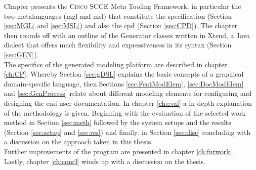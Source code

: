 Chapter  presents the \textsc{Cinco} SCCE Meta Tooling Framework, in particular the two metalanguages (\acrfull{mgl} and \acrfull{msl}) that constitute the specification (Section \ref{sec:MGL} and \ref{sec:MSL}) and also the \acrfull{cpd} (Section \ref{sec:CPD}). The chapter then rounds off with an outline of the Generator classes written in Xtend, a Java dialect that offers much flexibility and expressiveness in its syntax (Section \ref{sec:GEN}).\\The specifics of the generated modeling platform are described in chapter \ref{ch:CP}. Whereby Section \ref{sec:gDSL} explains the basic concepts of a graphical domain-specific language, then Sections \ref{sec:FeatModElem}, \ref{sec:DocModElem} and \ref{sec:GenProcess} relate about different modeling elements for configuring and designing the end user documentation. In chapter \ref{ch:eval} a in-depth explanation of the methodology is given. Beginning with the evaluation of the selected work method in Section \ref{sec:meth} followed by the system setups and the results (Section \ref{sec:setup} and \ref{sec:res}) and finally, in Section \ref{sec:disc} concluding with a discussion on the approach taken in this thesis.\\
Further improvements of the program are presented in chapter \ref{ch:futwork}. Lastly, chapter \ref{ch:concl} winds up with a discussion on the thesis.
